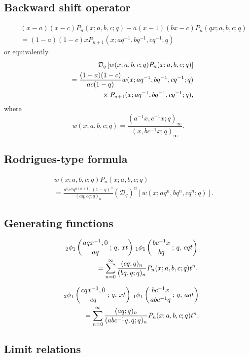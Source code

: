 \documentclass[envcountchap,graybox]{svmono}
\newcommand{\qhyp}[5]{\mbox{}_{#1}{\phi}_{#2}
\left(\genfrac{}{}{0pt}{}{#3}{#4}\,;\,q,\,#5\right)}
\newcommand{\mathindent}{\hspace{7.5mm}}
\begin{document}
\subsection*{Backward shift operator}
\begin{eqnarray}
\label{shift2BigqJacobiI}
& &(x-a)(x-c)P_n(x;a,b,c;q)-a(x-1)(bx-c)P_n(qx;a,b,c;q)\nonumber\\
& &{}=(1-a)(1-c)xP_{n+1}(x;aq^{-1},bq^{-1},cq^{-1};q)
\end{eqnarray}
or equivalently
\begin{eqnarray}
\label{shift2BigqJacobiII}
& &\mathcal{D}_q\left[w(x;a,b,c;q)P_n(x;a,b,c;q)\right]\nonumber\\
& &{}=\frac{(1-a)(1-c)}{ac(1-q)}w(x;aq^{-1},bq^{-1},cq^{-1};q)\nonumber\\
& &{}\mathindent{}\times P_{n+1}(x;aq^{-1},bq^{-1},cq^{-1};q),
\end{eqnarray}
where
$$w(x;a,b,c;q)=\frac{(a^{-1}x,c^{-1}x;q)_{\infty}}{(x,bc^{-1}x;q)_{\infty}}.$$

\subsection*{Rodrigues-type formula}
\begin{eqnarray}
\label{RodBigqJacobi}
& &w(x;a,b,c;q)P_n(x;a,b,c;q)\nonumber\\
& &{}=\frac{a^nc^nq^{n(n+1)}(1-q)^n}
{(aq,cq;q)_n}\left(\mathcal{D}_q\right)^n\left[w(x;aq^n,bq^n,cq^n;q)\right].
\end{eqnarray}

\subsection*{Generating functions}
\begin{eqnarray}
\label{GenBigqJacobi1}
& &\qhyp{2}{1}{aqx^{-1},0}{aq}{xt}\,\qhyp{1}{1}{bc^{-1}x}{bq}{cqt}\nonumber\\
& &{}=\sum_{n=0}^{\infty}\frac{(cq;q)_n}{(bq,q;q)_n}P_n(x;a,b,c;q)t^n.
\end{eqnarray}

\begin{eqnarray}
\label{GenBigqJacobi2}
& &\qhyp{2}{1}{cqx^{-1},0}{cq}{xt}\,\qhyp{1}{1}{bc^{-1}x}{abc^{-1}q}{aqt}\nonumber\\
& &{}=\sum_{n=0}^{\infty}\frac{(aq;q)_n}{(abc^{-1}q,q;q)_n}P_n(x;a,b,c;q)t^n.
\end{eqnarray}

\subsection*{Limit relations}
\end{document}
